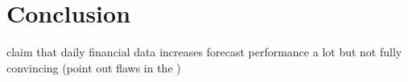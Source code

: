 \chapter{Conclusion}


\citet{AndreouEtal2013} claim that daily financial data increases forecast performance a lot but not fully convincing (point out flaws in the )



